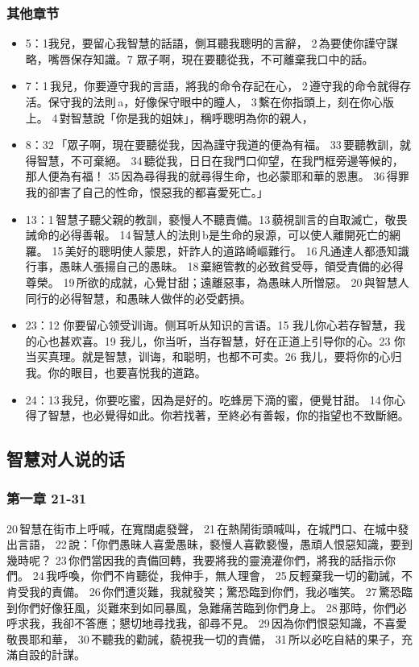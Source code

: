 \subsubsection{其他章节} 
\begin{itemize}
\itemsep-.45em 
\item 5：1我兒，要留心我智慧的話語，側耳聽我聰明的言辭， 2 為要使你謹守謀略，嘴唇保存知識。7 眾子啊，現在要聽從我，不可離棄我口中的話。
\item 7：1 我兒，你要遵守我的言語，將我的命令存記在心， 2 遵守我的命令就得存活。保守我的法則 a，好像保守眼中的瞳人， 3 繫在你指頭上，刻在你心版上。 4 對智慧說「你是我的姐妹」，稱呼聰明為你的親人，
\item 8：32 「眾子啊，現在要聽從我，因為謹守我道的便為有福。 33 要聽教訓，就得智慧，不可棄絕。 34 聽從我，日日在我門口仰望，在我門框旁邊等候的，那人便為有福！ 35 因為尋得我的就尋得生命，也必蒙耶和華的恩惠。 36 得罪我的卻害了自己的性命，恨惡我的都喜愛死亡。」
\item 13：1 智慧子聽父親的教訓，褻慢人不聽責備。13 藐視訓言的自取滅亡，敬畏誡命的必得善報。 14 智慧人的法則 b是生命的泉源，可以使人離開死亡的網羅。 15 美好的聰明使人蒙恩，奸詐人的道路崎嶇難行。 16 凡通達人都憑知識行事，愚昧人張揚自己的愚昧。 18 棄絕管教的必致貧受辱，領受責備的必得尊榮。 19 所欲的成就，心覺甘甜；遠離惡事，為愚昧人所憎惡。 20 與智慧人同行的必得智慧，和愚昧人做伴的必受虧損。
\item 23：12 你要留心领受训诲。侧耳听从知识的言语。15 我儿你心若存智慧，我的心也甚欢喜。19 我儿，你当听，当存智慧，好在正道上引导你的心。23 你当买真理。就是智慧，训诲，和聪明，也都不可卖。26 我儿，要将你的心归我。你的眼目，也要喜悦我的道路。
\item 24：13 我兒，你要吃蜜，因為是好的。吃蜂房下滴的蜜，便覺甘甜。 14 你心得了智慧，也必覺得如此。你若找著，至終必有善報，你的指望也不致斷絕。
\end{itemize}

\subsection{智慧对人说的话}
\subsubsection{第一章 21-31}
20 智慧在街市上呼喊，在寬闊處發聲， 21 在熱鬧街頭喊叫，在城門口、在城中發出言語， 22 說：「你們愚昧人喜愛愚昧，褻慢人喜歡褻慢，愚頑人恨惡知識，要到幾時呢？ 23 你們當因我的責備回轉，我要將我的靈澆灌你們，將我的話指示你們。 24 我呼喚，你們不肯聽從，我伸手，無人理會， 25 反輕棄我一切的勸誡，不肯受我的責備。 26 你們遭災難，我就發笑；驚恐臨到你們，我必嗤笑。 27 驚恐臨到你們好像狂風，災難來到如同暴風，急難痛苦臨到你們身上。 28 那時，你們必呼求我，我卻不答應；懇切地尋找我，卻尋不見。 29 因為你們恨惡知識，不喜愛敬畏耶和華， 30 不聽我的勸誡，藐視我一切的責備， 31 所以必吃自結的果子，充滿自設的計謀。
